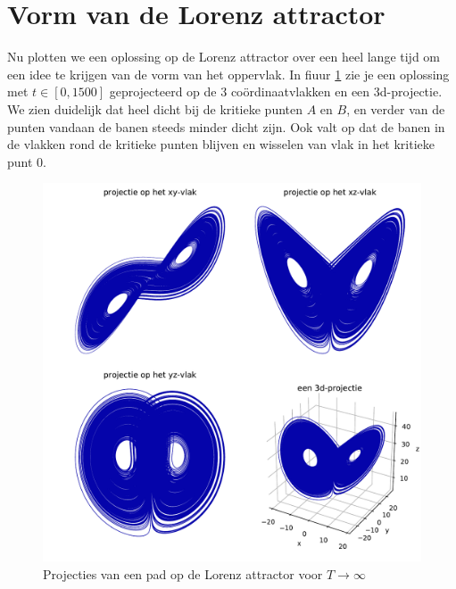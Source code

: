 \documentclass[12pt, a4paper]{article}
\theoremstyle{definition}
\begin{document}
\section{Vorm van de Lorenz attractor}
Nu plotten we een oplossing op de Lorenz attractor over een heel lange tijd om een idee te krijgen van de vorm van het oppervlak. In fiuur \ref{fig: projecties} zie je een oplossing met $t \in [0, 1500]$ geprojecteerd op de 3 coördinaatvlakken en een 3d-projectie. We zien duidelijk dat heel dicht bij de kritieke punten $A$ en $B$, en verder van de punten vandaan de banen steeds minder dicht zijn. Ook valt op dat de banen in de vlakken rond de kritieke punten blijven en wisselen van vlak in het kritieke punt $0$.

\begin{figure}
    \centering
    \includegraphics[width=0.9\linewidth]{projecties_opdracht_5.pdf}
    \caption{Projecties van een pad op de Lorenz attractor voor $T \rightarrow \infty$}
    \label{fig: projecties}
\end{figure}
\end{document}
